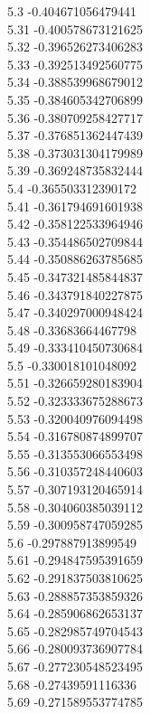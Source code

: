 {5.3	-0.404671056479441\\
5.31	-0.400578673121625\\
5.32	-0.396526273406283\\
5.33	-0.392513492560775\\
5.34	-0.388539968679012\\
5.35	-0.384605342706899\\
5.36	-0.380709258427717\\
5.37	-0.376851362447439\\
5.38	-0.373031304179989\\
5.39	-0.369248735832444\\
5.4	-0.365503312390172\\
5.41	-0.361794691601938\\
5.42	-0.358122533964946\\
5.43	-0.354486502709844\\
5.44	-0.350886263785685\\
5.45	-0.347321485844837\\
5.46	-0.343791840227875\\
5.47	-0.340297000948424\\
5.48	-0.33683664467798\\
5.49	-0.333410450730684\\
5.5	-0.330018101048092\\
5.51	-0.326659280183904\\
5.52	-0.323333675288673\\
5.53	-0.320040976094498\\
5.54	-0.316780874899707\\
5.55	-0.313553066553498\\
5.56	-0.310357248440603\\
5.57	-0.307193120465914\\
5.58	-0.304060385039112\\
5.59	-0.300958747059285\\
5.6	-0.297887913899549\\
5.61	-0.294847595391659\\
5.62	-0.291837503810625\\
5.63	-0.288857353859326\\
5.64	-0.285906862653137\\
5.65	-0.282985749704543\\
5.66	-0.280093736907784\\
5.67	-0.277230548523495\\
5.68	-0.27439591116336\\
5.69	-0.271589553774785\\
}
